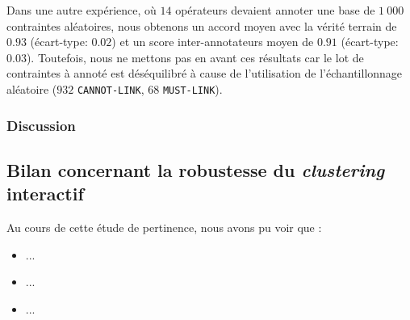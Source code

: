 			\begin{leftBarInformation}
				Dans une autre expérience, où $14$ opérateurs devaient annoter une base de $1~000$ contraintes aléatoires, nous obtenons un accord moyen avec la vérité terrain de $0.93$ (écart-type: $0.02$) et un score inter-annotateurs moyen de $0.91$ (écart-type: $0.03$).
				Toutefois, nous ne mettons pas en avant ces résultats car le lot de contraintes à annoté est déséquilibré à cause de l'utilisation de l'échantillonnage aléatoire ($932$ \texttt{CANNOT-LINK}, $68$ \texttt{MUST-LINK}).
			\end{leftBarInformation}
	
		\subsubsection{Discussion}
		
		
			
			
			
	\subsection{Bilan concernant la robustesse du \textit{clustering} interactif}
	\label{section:4.6.3-ETUDE-ROBUSTESSE-MISE-EN-COMMUN}
	
	
		\begin{leftBarSummary}
			Au cours de cette étude de pertinence, nous avons pu voir que :
			\begin{itemize}
				\item[\itemok] ...
				\item[\itemok] ...
				\item[\itemok] ...
			\end{itemize}
		\end{leftBarSummary}